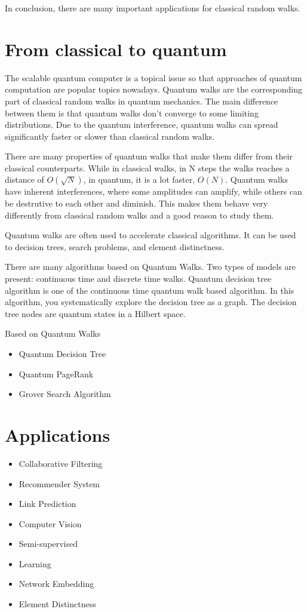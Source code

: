 In conclusion, there are many important applications for classical random walks.

\section{From classical to quantum}

The scalable quantum computer is a topical issue so that approaches of quantum computation are popular topics nowadays. Quantum walks are the corresponding part of classical random walks in quantum mechanics. The main difference between them is that quantum walks don’t converge to some limiting distributions. Due to the quantum interference, quantum walks can spread significantly faster or slower than classical random walks. 

There are many properties of quantum walks that make them differ from their classical counterparts. While in classical walks, in N steps the walks reaches a distance of $O(\sqrt{N})$, in quantum, it is a lot faster, $O(N)$. Quantum walks have inherent interferences, where some amplitudes can amplify, while others can be destrutive to each other and diminish. This makes them behave very differently from classical random walks and a good reason to study them.

Quantum walks are often used to accelerate classical algorithms. It can be used to decision trees, search problems, and element distinctness.

There are many algorithms based on Quantum Walks. Two types of models are present: continuous time and discrete time walks. Quantum decision tree algorithm is one of the continuous time quantum walk based algorithm. In this algorithm, you systematically explore the decision tree as a graph. The decision tree nodes are quantum states in a Hilbert space. 

Based on Quantum Walks
\begin{itemize}
\item Quantum Decision Tree
\item Quantum PageRank
\item Grover Search Algorithm
\end{itemize}

\section{Applications}
\begin{itemize}
\item Collaborative Filtering
\item Recommender System
\item Link Prediction
\item Computer Vision
\item Semi-supervised
\item Learning
\item Network Embedding
\item Element Distinctness
\end{itemize}